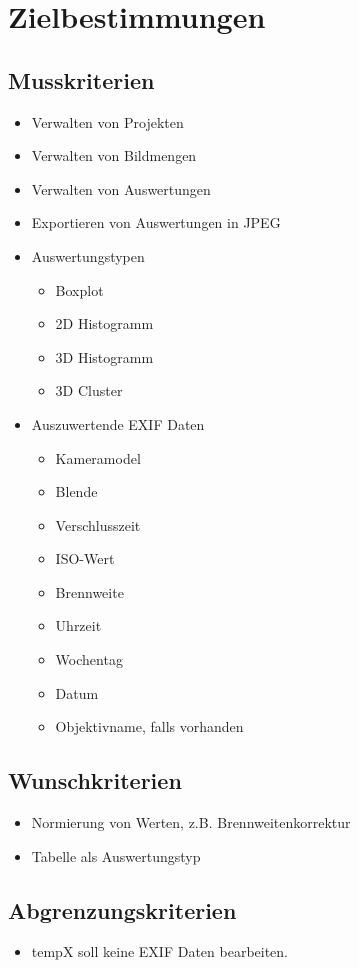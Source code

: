 \section{Zielbestimmungen}

\subsection{Musskriterien} 
\begin{itemize}
	\item Verwalten von Projekten
	\item Verwalten von Bildmengen
	\item Verwalten von Auswertungen
	\item Exportieren von Auswertungen in JPEG
	\item Auswertungstypen
		\begin{itemize}
			\item Boxplot
			\item 2D Histogramm 
			\item 3D Histogramm 
			\item 3D Cluster
		\end{itemize}
	\item Auszuwertende EXIF Daten
			\begin{itemize}
			\item Kameramodel
			\item Blende 
			\item Verschlusszeit
			\item ISO-Wert
			\item Brennweite
			\item Uhrzeit
			\item Wochentag
			\item Datum
			\item Objektivname, falls vorhanden
		\end{itemize}
	
\end{itemize}

\subsection{Wunschkriterien} 
\begin{itemize}
	\item Normierung von Werten, z.B. Brennweitenkorrektur
	\item Tabelle als Auswertungstyp
\end{itemize}

\subsection{Abgrenzungskriterien} 
\begin{itemize}
	\item \gls{tempX} soll keine EXIF Daten bearbeiten.
\end{itemize}
